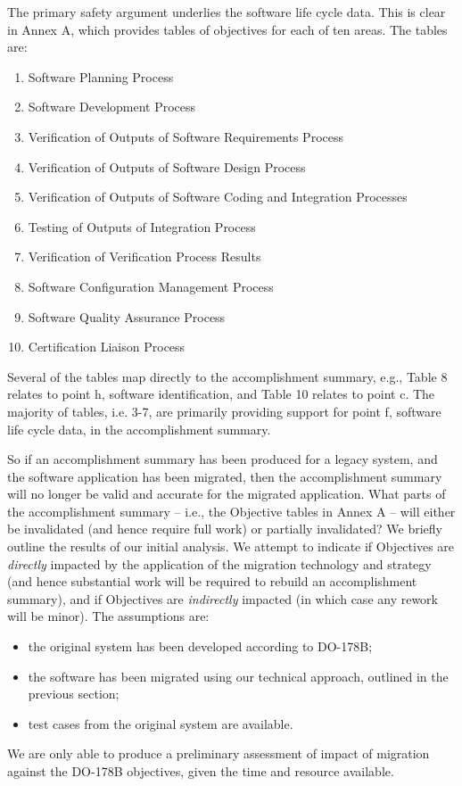 \documentclass{llncs}
\begin{document}
The primary safety argument underlies the software life cycle data. This is clear in Annex A, which provides tables of objectives for each of ten areas. The tables are:
\begin{enumerate}
\item Software Planning Process
\item Software Development Process
\item Verification of Outputs of Software Requirements Process
\item Verification of Outputs of Software Design Process
\item Verification of Outputs of Software Coding and Integration Processes
\item Testing of Outputs of Integration Process 
\item Verification of Verification Process Results
\item Software Configuration Management Process
\item Software Quality Assurance Process
\item Certification Liaison Process
\end{enumerate}

Several of the tables map directly to the accomplishment summary, e.g., Table 8 relates to point h, software identification, and Table 10 relates to point c. The majority of tables, i.e. 3-7, are primarily providing support for point f, software life cycle data, in the accomplishment summary. 

So if an accomplishment summary has been produced for a legacy system, and the software application has been migrated, then the accomplishment summary will no longer be valid and accurate for the migrated application. What parts of the accomplishment summary -- i.e., the Objective tables in Annex A -- will either be invalidated (and hence require full work) or partially invalidated? We briefly outline the results of our initial analysis. We attempt to indicate if Objectives are \textit{directly} impacted by the application of the migration technology and strategy (and hence substantial work will be required to rebuild an accomplishment summary), and if Objectives are \textit{indirectly} impacted (in which case any rework will be minor). The assumptions are:
\begin{itemize}
\item the original system has been developed according to DO-178B;
\item the software has been migrated using our technical approach, outlined in the previous section;
\item test cases from the original system are available.
\end{itemize}
We are only able to produce a preliminary assessment of impact of migration against the DO-178B objectives, given the time and resource available. 
\end{document}
